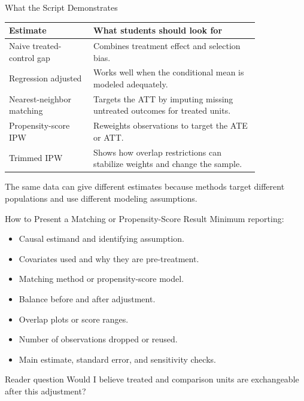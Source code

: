 \documentclass[11pt,aspectratio=169]{beamer}
\begin{document}
\begin{frame}{What the Script Demonstrates}
  \small
  \begin{tabular}{>{\raggedright\arraybackslash}p{0.28\linewidth}>{\raggedright\arraybackslash}p{0.55\linewidth}}
    \toprule
    Estimate & What students should look for \\
    \midrule
    Naive treated-control gap & Combines treatment effect and selection bias. \\
    Regression adjusted & Works well when the conditional mean is modeled adequately. \\
    Nearest-neighbor matching & Targets the ATT by imputing missing untreated outcomes for treated units. \\
    Propensity-score IPW & Reweights observations to target the ATE or ATT. \\
    Trimmed IPW & Shows how overlap restrictions can stabilize weights and change the sample. \\
    \bottomrule
  \end{tabular}
  \vspace{0.6em}

  The same data can give different estimates because methods target different populations and use different modeling assumptions.
\end{frame}

\begin{frame}{How to Present a Matching or Propensity-Score Result}
  Minimum reporting:
  \begin{itemize}
    \item Causal estimand and identifying assumption.
    \item Covariates used and why they are pre-treatment.
    \item Matching method or propensity-score model.
    \item Balance before and after adjustment.
    \item Overlap plots or score ranges.
    \item Number of observations dropped or reused.
    \item Main estimate, standard error, and sensitivity checks.
  \end{itemize}
  \begin{block}{Reader question}
    Would I believe treated and comparison units are exchangeable after this adjustment?
  \end{block}
\end{frame}
\end{document}
